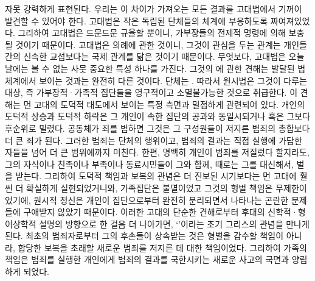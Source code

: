 자못 강력하게 표현된다.
우리는 이 차이가 가져오는 모든 결과를 고대법에서 기꺼이 발견할 수 있어야 한다.
고대법은 작은 독립된 단체들의 체계에 부응하도록 짜여져있었다.
그리하여 고대법은 드문드문 규율할 뿐이니,
가부장들의 전제적 명령에 의해 보충될 것이기 때문이다.
고대법은 의례에 관한 것이니,
그것이 관심을 두는 관계는
개인들 간의 신속한 교섭보다는
국제 관계를 닮은 것이기 때문이다.
무엇보다, 고대법은 오늘날에는 볼 수 없는 사뭇 중요한 특성 하나를 가진다.
그것의 에 관한 견해는
발달된 법체계에서 보이는 것과는 완전히 다른 것이다.
단체는 .
따라서 원시법은 그것이 다루는 대상, 즉 가부장적^^b7가족적 집단들을
영구적이고 소멸불가능한 것으로 취급한다.
이 견해는 먼 고대의 도덕적 태도에서 보이는 특정 측면과 밀접하게 관련되어 있다.
개인의 도덕적 상승과 도덕적 하락은 그 개인이 속한 집단의 공과와
동일시되거나 혹은 그보다 후순위로 밀렸다.
공동체가 죄를 범하면
그것은 그 구성원들이 저지른 범죄의 총합보다 더 큰 죄가 된다.
그러한 범죄는 단체의 행위이고,
범죄의 결과는 직접 실행에 가담한 자들을 넘어 더 큰 범위에까지 미친다.
한편, 명백히 개인이 범죄를 저질렀다 할지라도,
그의 자식이나 친족이나 부족이나 동료시민들이 그와 함께,
때로는 그를 대신해서, 벌을 받는다.
그리하여 도덕적 책임과 보복의 관념은
더 진보된 시기보다는 먼 고대에 훨씬 더 확실하게 실현되었거니와,
가족집단은 불멸이었고 그것의 형벌 책임은 무제한이었기에,
원시적 정신은 개인이 집단으로부터 완전히 분리되면서 나타나는 곤란한 문제들에
구애받지 않았기 때문이다.
이러한 고대의 단순한 견해로부터 후대의 신학적^^b7형이상학적 설명의 방향으로
한 걸음 더 나아가면,
`'이라는 초기 그리스의 관념을 만나게 된다.
최초의 범죄자로부터 그의 후손들이 상속받는 것은
형벌을 감수할 책임이 아니라,
합당한 보복을 초래할
새로운 범죄를 저지른 데 대한 책임이었다.
그리하여 가족의 책임은
범죄를 실행한 개인에게 범죄의 결과를 국한시키는 새로운 사고의 국면과
양립하게 되었다.

